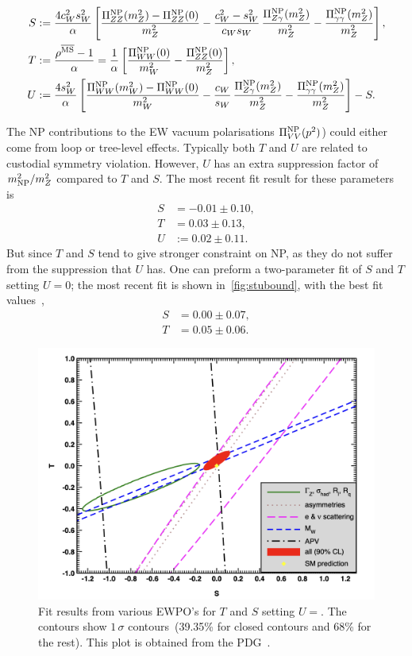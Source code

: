 \begin{tcolorbox}[title=The oblique parameters,
	title filled=false,
	colback=Mahogany!5!white,
	colframe=Mahogany]
	\begin{align}
		S &:=\frac{4 c_W^2 s_W^2}{\alpha} \left[ \frac{\Pi_{ZZ}^{\mathrm{NP}} (m_Z^2)- \Pi_{ZZ}^{\mathrm{NP}} (0)}{m_Z^2}  - \frac{c_W^2-s_W^2}{c_Ws_W}\,\frac{\Pi_{Z\gamma}^{\mathrm{NP}}(m_Z^2)}{m_Z^2}-\frac{\Pi_{\gamma\gamma}^{\mathrm{NP}}(m_Z^2)}{m_Z^2}\right],  \nonumber \\
		T &:=\frac{\rho^{\overline{\mathrm{MS}}}-1}{\alpha}  = \frac{1}{\alpha} \left[ \frac{\Pi^{\mathrm{NP}}_{WW}(0)}{m_W^2}- \frac{\Pi^{\mathrm{NP}}_{ZZ}(0)}{m_Z^2} \right] , \\
		U&:= \frac{4 s_W^2}{\alpha} \left[ \frac{\Pi_{WW}^{\mathrm{NP}} (m_W^2)- \Pi_{WW}^{\mathrm{NP}} (0)}{m_W^2}   - \frac{c_W}{s_W}\,\frac{\Pi_{Z\gamma}^{\mathrm{NP}}(m_Z^2)}{m_Z^2}-\frac{\Pi_{\gamma\gamma}^{\mathrm{NP}}(m_Z^2)}{m_Z^2}\right] -S .\nonumber 
	\end{align}
\end{tcolorbox}
The NP contributions to the EW vacuum polarisations $\Pi_{VV}^{\mathrm{NP}}(p^2)$) could either come from loop or tree-level effects. Typically both $T$ and $U$ are related to custodial symmetry violation. However, $U$ has an extra suppression factor of $m_{\mathrm{NP}}^2/m_Z^2$ compared to $T$ and $S$. The most recent fit result for these parameters is~\cite{Zyla:2020zbs}
\begin{align}
	S &=-0.01\pm0.10,  \nonumber \\
	T &= 0.03\pm0.13, \\
	U&:= 0.02\pm0.11.\nonumber 
\end{align}
But since $T$ and $S$ tend to give stronger constraint on NP, as they do not suffer from the suppression that $U$ has. One can preform a two-parameter fit of $S$ and $T$ setting $U=0$; the most recent fit is shown in~\autoref{fig:stubound}, with the best fit values~\cite{Zyla:2020zbs}, \\
\begin{align}
	S &=0.00\pm0.07,  \nonumber \\
	T &= 0.05\pm0.06.
\end{align}
\begin{figure}[t]
	\centering
	\includegraphics[width=0.65\linewidth]{./figures/stu-pdg}
	\caption{ Fit results from various EWPO's for $T$ and $S$ setting $U=$. The contours show $1\,\sigma$ contours~(39.35\% for closed contours and 68\% for the rest). This plot is obtained from the PDG~\cite{Zyla:2020zbs}.  }  \label{fig:stubound}
\end{figure}
